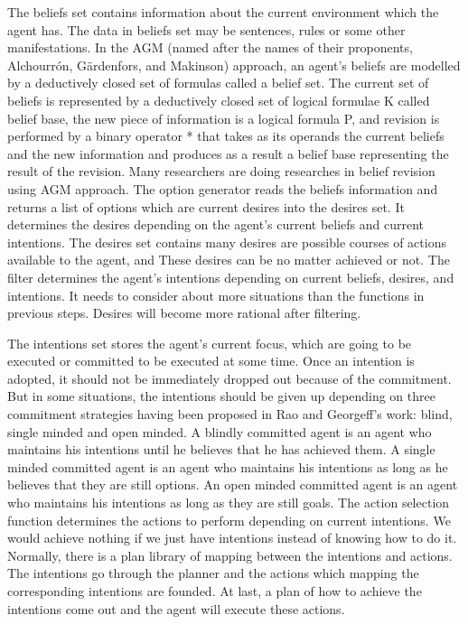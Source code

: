 The beliefs set contains information about the current environment which the agent has. The data in beliefs set may be sentences, rules or some other manifestations. In the AGM (named after the names of their proponents, Alchourrón, Gärdenfors, and Makinson) approach, an agent’s beliefs are modelled by a deductively closed set of formulas called a belief set\cite{James_revise_2011}.
The current set of beliefs is represented by a deductively closed set of logical formulae K called belief base, the new piece of information is a logical formula P, and revision is performed by a binary operator * that takes as its operands the current beliefs and the new information and produces as a result a belief base representing the result of the revision\cite{M_Belief}. Many researchers are doing researches in belief revision using AGM approach.
The option generator reads the beliefs information and returns a list of options which are current desires into the desires set. It determines the desires depending on the agent’s current beliefs and current intentions. The desires set contains many desires are possible courses of actions available to the agent, and These desires can be no matter achieved or not. The filter determines the agent’s intentions depending on current beliefs, desires, and intentions. It needs to consider about more situations than the functions in previous steps. Desires will become more rational after filtering.

The intentions set stores the agent’s current focus, which are going to be executed or committed to be executed at some time. Once an intention is adopted, it should not be immediately dropped out because of the commitment. But in some situations, the intentions should be given up depending on  three commitment strategies having been proposed in Rao and Georgeff’s work:  blind, single minded and open minded. A blindly committed agent is an agent who maintains his intentions until he believes that he has achieved them. A single minded committed agent is an agent who maintains his intentions as long as he believes that they are still options. An open minded committed agent is an agent who maintains his intentions as long as they are still goals\cite{Roberto_BDIATL_2005}. The action selection function determines the actions to perform depending on current intentions. We would achieve nothing if we just have intentions instead of knowing how to do it. Normally, there is a plan library of mapping between the intentions and actions. The intentions go through the planner and the actions which mapping the corresponding intentions are founded. At last, a plan of how to achieve the intentions come out and the agent will execute these actions.

